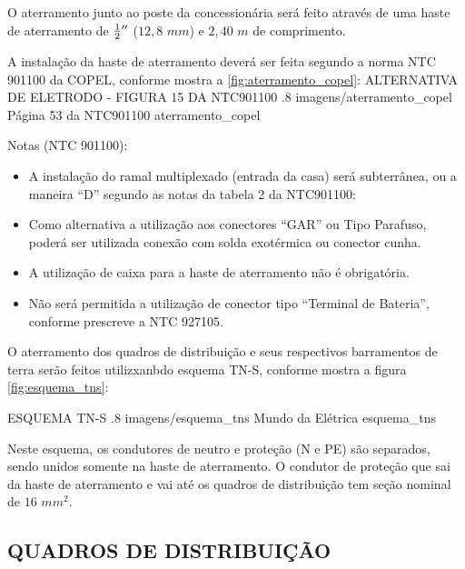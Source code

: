 O aterramento junto ao poste da concessionária será feito através de uma haste de aterramento de $\frac{1}{2} {}^{\prime\prime}$ ($12,8$ $mm$) e $2,40$ $m$ de comprimento.

A instalação da haste de aterramento deverá ser feita segundo a norma NTC 901100 da COPEL, conforme mostra a \autoref{fig:aterramento_copel}:
\pagebreak 
\figura
{ALTERNATIVA DE ELETRODO - FIGURA 15 DA NTC901100} %
{.8} %
{imagens/aterramento_copel} %
{Página 53 da NTC901100} %
{aterramento_copel} %
{}
{}


Notas (NTC 901100):

\begin{itemize}
	\item A instalação do ramal multiplexado (entrada da casa) será subterrânea, ou a maneira ``D'' segundo as notas da tabela 2 da NTC901100:
	
	\item Como alternativa a utilização aos conectores ``GAR'' ou Tipo Parafuso, poderá ser utilizada conexão com solda exotérmica ou conector cunha.
	
	\item A utilização de caixa para a haste de aterramento não é obrigatória.
	
	\item Não será permitida a utilização de conector tipo ``Terminal de Bateria'', conforme prescreve a NTC 927105.
	
\end{itemize}

O aterramento dos quadros de distribuição e seus respectivos barramentos de terra serão feitos utilizxanbdo esquema TN-S, conforme mostra a figura \autoref{fig:esquema_tns}:


\figura
{ESQUEMA TN-S} %
{.8} %
{imagens/esquema_tns} %
{Mundo da Elétrica} %
{esquema_tns} %
{}
{}

Neste esquema, os condutores de neutro e proteção (N e PE) são separados, sendo unidos somente na haste de aterramento. O condutor de proteção que sai da haste de aterramento e vai até os quadros de distribuição tem seção nominal de $16$ $mm^2$.

\subsection{QUADROS DE DISTRIBUIÇÃO}

